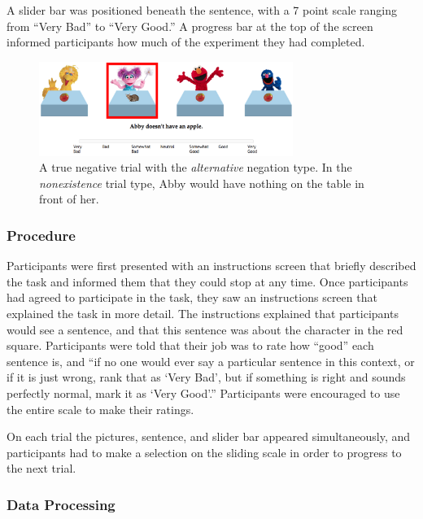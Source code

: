 \documentclass[10pt,letterpaper]{article}
\begin{document}
A slider bar was positioned beneath the sentence, with a 7 point scale ranging from ``Very Bad'' to ``Very Good.''  A progress bar at the top of the screen informed participants how much of the experiment they had completed. 

\begin{figure}[t]
\begin{center} 
\includegraphics[width=3.25in]{figures/example.png}
\caption{\label{fig:trial} A true negative trial with the \emph{alternative} negation type. In the \emph{nonexistence} trial type, Abby would have nothing on the table in front of her.}
\end{center} 
\end{figure}

\subsubsection{Procedure}

Participants were first presented with an instructions screen that briefly described the task and informed them that they could stop at any time.  Once participants had agreed to participate in the task, they saw an instructions screen that explained the task in more detail.  The instructions explained that participants would see a sentence, and that this sentence was about the character in the red square.  Participants were told that their job was to rate how ``good'' each sentence is, and ``if no one would ever say a particular sentence in this context, or if it is just wrong, rank that as `Very Bad', but if something is right and sounds perfectly normal, mark it as `Very Good'.''  Participants were encouraged to use the entire scale to make their ratings.

On each trial the pictures, sentence, and slider bar appeared simultaneously, and participants had to make a selection on the sliding scale in order to progress to the next trial.  

\subsubsection{Data Processing}
\end{document}
